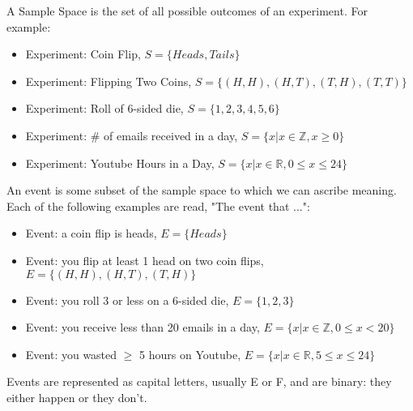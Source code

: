 \documentclass[11pt]{article}
\newcommand{\R}{\mathbb{R}}
\newcommand{\Z}{\mathbb{Z}}
\begin{document}
\begin{definition}
  A Sample Space is the set of all possible outcomes of an experiment. For example:
  \begin{itemize}
    \item Experiment: Coin Flip, $S = \{Heads, Tails\}$
    \item Experiment: Flipping Two Coins, $S = \{(H,H),(H,T),(T,H),(T,T)\}$
    \item Experiment: Roll of 6-sided die, $S = \{1,2,3,4,5,6\}$
    \item Experiment: \# of emails received in a day, $S = \{x|x \in \Z, x \geq 0\}$
    \item Experiment: Youtube Hours in a Day, $S = \{x|x\in\R, 0\leq x \leq 24\}$
  \end{itemize}
\end{definition}
\begin{definition}
  An event is some subset of the sample space to which we can ascribe meaning. Each of the following examples are read, "The event that ...":
  \begin{itemize}
    \item Event: a coin flip is heads, $E = \{Heads\}$
    \item Event: you flip at least 1 head on two coin flips, $E = \{(H,H),(H,T),(T,H)\}$
    \item Event: you roll 3 or less on a 6-sided die, $E = \{1,2,3\}$
    \item Event: you receive less than 20 emails in a day, $E = \{x|x \in \Z, 0 \leq x < 20\}$
    \item Event: you wasted $\geq$ 5 hours on Youtube, $E = \{x|x\in\R, 5 \leq x \leq 24\}$
  \end{itemize}
\end{definition}
Events are represented as capital letters, usually E or F, and are binary: they either happen or they don't.



% 
% 
\end{document}
